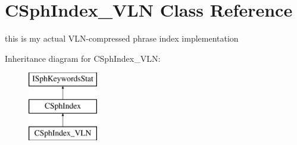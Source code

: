 \hypertarget{classCSphIndex__VLN}{\section{C\-Sph\-Index\-\_\-\-V\-L\-N Class Reference}
\label{classCSphIndex__VLN}
}


this is my actual V\-L\-N-\/compressed phrase index implementation  


Inheritance diagram for C\-Sph\-Index\-\_\-\-V\-L\-N\-:\begin{figure}[H]
\begin{center}
\leavevmode
\includegraphics[height=3.000000cm]{classCSphIndex__VLN}
\end{center}
\end{figure}
